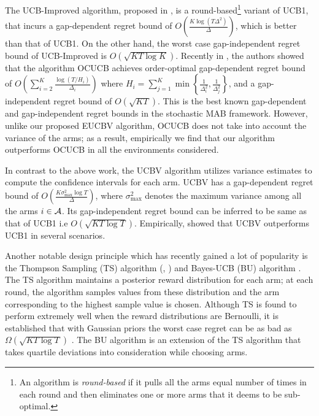 	 The UCB-Improved algorithm, proposed in \citet{auer2010ucb}, is a round-based\footnote{An algorithm is \textit{round-based} if it pulls all the arms equal number of times in each round and then eliminates one or more arms that it deems  to be sub-optimal.} variant of UCB1, that 
incurs a gap-dependent regret bound of $O\left(\frac{K\log (T\Delta^{2})}{\Delta}\right)$, which is better than that of UCB1. On the other hand, the worst case gap-independent regret bound of UCB-Improved is $O\left(\sqrt{KT\log K}\right)$. Recently in \citet{lattimore2015optimally}, the authors showed that  the algorithm OCUCB achieves order-optimal gap-dependent regret bound of $O\left(\sum_{i=2}^{K}\frac{\log\left(T/H_i\right)}{\Delta_i}\right)$ where $H_i=\sum_{j=1}^{K}\min\left\lbrace \frac{1}{\Delta_i^2},\frac{1}{\Delta_j^2}\right\rbrace$, and a gap-independent regret bound of $O\left( \sqrt{KT}\right)$. This is the best known gap-dependent and gap-independent regret bounds in the stochastic MAB framework. However, unlike our proposed EUCBV algorithm, OCUCB does not take into account the variance of the arms; as a result, empirically  we find  that our algorithm outperforms OCUCB in all the environments considered. 

	In contrast to the above work, the UCBV \citep{audibert2009exploration} algorithm utilizes variance estimates to compute the confidence intervals for each arm. UCBV has a gap-dependent regret bound of $O\left(\frac{K\sigma_{\max}^{2}\log T}{\Delta}\right)$, where $\sigma_{\max}^{2}$ denotes the maximum variance among all the arms $i\in \mathcal{A}$. Its gap-independent regret bound can be inferred to be same as that of UCB1 i.e $O \left(\sqrt{KT\log T}\right)$. Empirically, \citet{audibert2009exploration} showed that UCBV outperforms UCB1 in several scenarios. 
	
	Another notable design principle which has recently gained a lot of popularity is the Thompson Sampling (TS) algorithm (\citep{thompson1933likelihood}, \citep{agrawal2011analysis})  and  Bayes-UCB (BU) algorithm \citep{kaufmann2012bayesian}. %
The TS algorithm maintains a posterior reward distribution for each arm; at each round, the algorithm samples values from these distribution and the arm corresponding to the highest sample value is chosen. Although TS is found to perform extremely well when the reward distributions are Bernoulli, it is established that with Gaussian priors the worst case regret can be as bad as $\Omega \left( \sqrt{KT\log T}\right)$ \citep{lattimore2015optimally}. The BU algorithm is an extension of the TS algorithm that takes quartile deviations into consideration while choosing arms.
	
